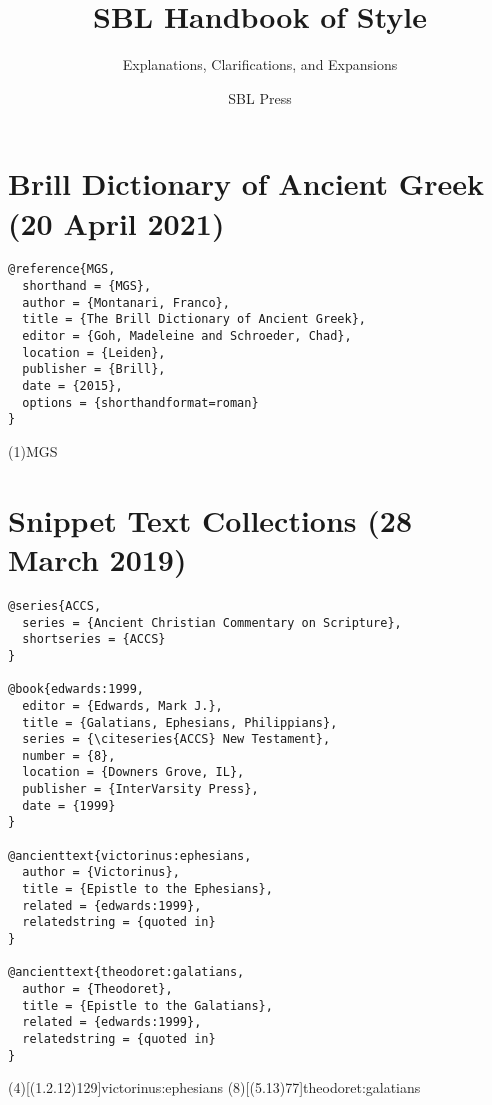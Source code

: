 \documentclass[a4paper]{article}
\begin{document}
\title{SBL Handbook of Style}
\author{Explanations, Clarifications, and Expansions}
\date{SBL Press}
\maketitle

\tableofcontents

\section{Brill Dictionary of Ancient Greek (20 April 2021)}

\begin{verbatim}
@reference{MGS,
  shorthand = {MGS},
  author = {Montanari, Franco},
  title = {The Brill Dictionary of Ancient Greek},
  editor = {Goh, Madeleine and Schroeder, Chad},
  location = {Leiden},
  publisher = {Brill},
  date = {2015},
  options = {shorthandformat=roman}
}
\end{verbatim}

\examplecite(1){MGS}
\exampleabbreviations
{}

\section{Snippet Text Collections (28 March 2019)}

\begin{verbatim}
@series{ACCS,
  series = {Ancient Christian Commentary on Scripture},
  shortseries = {ACCS}
}

@book{edwards:1999,
  editor = {Edwards, Mark J.},
  title = {Galatians, Ephesians, Philippians},
  series = {\citeseries{ACCS} New Testament},
  number = {8},
  location = {Downers Grove, IL},
  publisher = {InterVarsity Press},
  date = {1999}
}

@ancienttext{victorinus:ephesians,
  author = {Victorinus},
  title = {Epistle to the Ephesians},
  related = {edwards:1999},
  relatedstring = {quoted in}
}

@ancienttext{theodoret:galatians,
  author = {Theodoret},
  title = {Epistle to the Galatians},
  related = {edwards:1999},
  relatedstring = {quoted in}
}
\end{verbatim}

\examplecite(4)[(1.2.12)129]{victorinus:ephesians}
\examplecite(8)[(5.13)77]{theodoret:galatians}
\exampleabbreviations
\examplebibliography
{}
\end{document}
